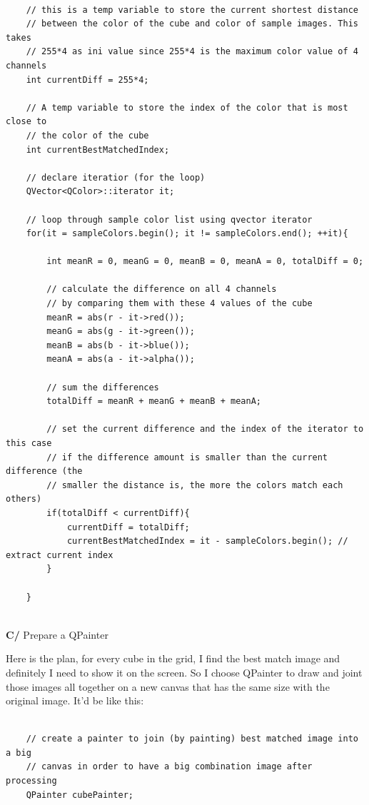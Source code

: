 \documentclass[english]{article}
\begin{document}
{\lstset{language=C++}
\begin{lstlisting}

	// this is a temp variable to store the current shortest distance
	// between the color of the cube and color of sample images. This takes 
	// 255*4 as ini value since 255*4 is the maximum color value of 4 channels
	int currentDiff = 255*4;
	
	// A temp variable to store the index of the color that is most close to 
	// the color of the cube
	int currentBestMatchedIndex;
	
	// declare iteratior (for the loop)
	QVector<QColor>::iterator it;
	
	// loop through sample color list using qvector iterator
	for(it = sampleColors.begin(); it != sampleColors.end(); ++it){
	
		int meanR = 0, meanG = 0, meanB = 0, meanA = 0, totalDiff = 0;
		
		// calculate the difference on all 4 channels
		// by comparing them with these 4 values of the cube
		meanR = abs(r - it->red());
		meanG = abs(g - it->green());
		meanB = abs(b - it->blue());
		meanA = abs(a - it->alpha());
		
		// sum the differences
		totalDiff = meanR + meanG + meanB + meanA;
		
		// set the current difference and the index of the iterator to this case
		// if the difference amount is smaller than the current difference (the
		// smaller the distance is, the more the colors match each others)
		if(totalDiff < currentDiff){
			currentDiff = totalDiff;
			currentBestMatchedIndex = it - sampleColors.begin(); // extract current index
		}
		
	}


\end{lstlisting}


\textbf{C/} Prepare a QPainter \newline

Here is the plan, for every cube in the grid, I find the best match image and definitely I need to show it on the screen. So I choose QPainter to draw and joint those images all together on a new canvas that has the same size with the original image. It'd be like this: 

\lstset{language=C++}
\begin{lstlisting}

	// create a painter to join (by painting) best matched image into a big 
	// canvas in order to have a big combination image after processing
	QPainter cubePainter;
	

\end{lstlisting}}
\end{document}
